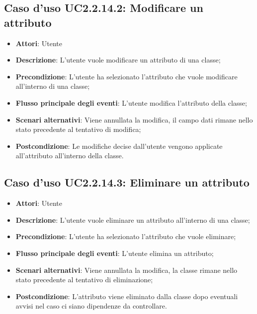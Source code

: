 \documentclass[../AnalisiDeiRequisiti.tex]{subfiles}
\begin{document}
			\subsection{Caso d'uso UC2.2.14.2: Modificare un attributo}
			\begin{itemize}
				\item \textbf{Attori}: Utente
				\item \textbf{Descrizione}: L'utente vuole modificare un attributo di una classe;
				\item \textbf{Precondizione}: L'utente ha selezionato l'attributo che vuole modificare all'interno di una classe;
				\item \textbf{Flusso principale degli eventi}: L'utente modifica l'attributo della classe;
				\item \textbf{Scenari alternativi}: Viene annullata la modifica, il campo dati rimane nello stato precedente al tentativo di modifica;
				\item \textbf{Postcondizione}: Le modifiche decise dall'utente vengono applicate all'attributo all'interno della classe.
			\end{itemize}
			\subsection{Caso d'uso UC2.2.14.3: Eliminare un attributo}
			\begin{itemize}
				\item \textbf{Attori}: Utente
				\item \textbf{Descrizione}: L'utente vuole eliminare un attributo all'interno di una classe;
				\item \textbf{Precondizione}: L'utente ha selezionato l'attributo che vuole eliminare;
				\item \textbf{Flusso principale degli eventi}: L'utente elimina un attributo;
				\item \textbf{Scenari alternativi}: Viene annullata la modifica, la classe rimane nello stato precedente al tentativo di eliminazione;
				\item \textbf{Postcondizione}: L'attributo viene eliminato dalla classe dopo eventuali avvisi nel caso ci siano dipendenze da controllare.
			\end{itemize}
\end{document}
